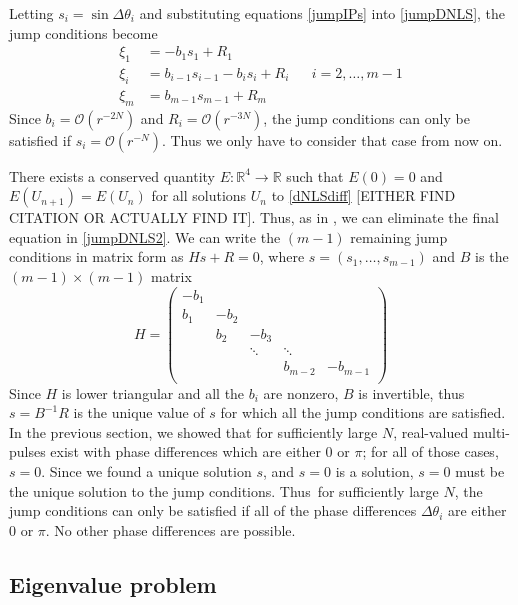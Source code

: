 \documentclass[12pt]{article}
\def\R{{\mathbb R}}
\begin{document}
Letting $s_i = \sin{\Delta\theta_i}$ and substituting equations \eqref{jumpIPs} into \eqref{jumpDNLS}, the jump conditions become
\begin{equation}\label{jumpDNLS2}
\begin{aligned}
\xi_1 &= -b_1 s_1 + R_1 \\
\xi_i &= b_{i-1} s_{i-1} - b_i s_i + R_i
&& i = 2, \dots, m-1 \\
\xi_m &= b_{m-1} s_{m-1} + R_m
\end{aligned}
\end{equation}
Since $b_i = \mathcal{O}(r^{-2N})$ and $R_i = \mathcal{O}(r^{-3N})$, the jump conditions can only be satisfied if $s_i = \mathcal{O}(r^{-N})$. Thus we only have to consider that case from now on. 
 
There exists a conserved quantity $E: \R^4 \rightarrow \R$ such that $E(0) = 0$ and $E(U_{n+1}) = E(U_n)$ for all solutions $U_n$ to \eqref{dNLSdiff} [EITHER FIND CITATION OR ACTUALLY FIND IT]. Thus, as in \cite{SandstedeStrut}, we can eliminate the final equation in \eqref{jumpDNLS2}. We can write the $(m-1)$ remaining jump conditions in matrix form as $H s + R = 0$, where $s = (s_1, \dots, s_{m-1})$ and $B$ is the $(m-1)\times(m-1)$ matrix
\[
H = \begin{pmatrix}
-b_1 \\
b_1 & -b_2 \\
& b_2 & -b_3 \\
&& \ddots & \ddots \\
&&& b_{m-2} & -b_{m-1} \\
\end{pmatrix}
\]
Since $H$ is lower triangular and all the $b_i$ are nonzero, $B$ is invertible, thus $s = B^{-1}R$ is the unique value of $s$ for which all the jump conditions are satisfied. In the previous section, we showed that for sufficiently large $N$, real-valued multi-pulses exist with phase differences which are either 0 or $\pi$; for all of those cases, $s = 0$. Since we found a unique solution $s$, and $s = 0$ is a solution, $s = 0$ must be the unique solution to the jump conditions. Thus\ for sufficiently large $N$, the jump conditions can only be satisfied if all of the phase differences $\Delta \theta_i$ are either 0 or $\pi$. No other phase differences are possible.

\subsection{Eigenvalue problem}
\end{document}
